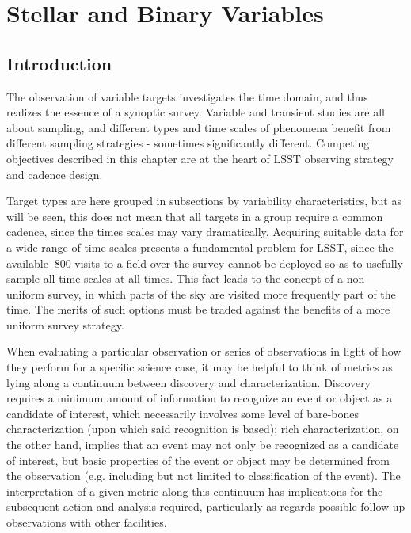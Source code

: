 
\chapter[Stellar and Binary Variables]{Stellar and Binary Variables}
\def\chpname{variables}\label{chp:\chpname}




\section{Introduction}

The observation of variable targets investigates the time domain, and thus realizes the essence of a synoptic survey.  Variable and transient studies are all about sampling, and different types and time scales of phenomena benefit from different sampling strategies - sometimes significantly different.  Competing objectives described in this chapter are at the heart of LSST observing strategy and cadence design.

Target types are here grouped in subsections by variability characteristics, but as will be seen, this does not mean that all targets in a group require a common cadence, since the times scales may vary dramatically.  Acquiring suitable data for a wide range of time scales presents a fundamental problem for LSST, since the available $~$800 visits to a field over the survey cannot be deployed so as to usefully sample all time scales at all times.  This fact leads to the concept of a non-uniform survey, in which parts of the sky are visited more frequently part of the time.  The merits of such options must be traded against the benefits of a more uniform survey strategy.

When evaluating a particular observation or series of observations in light of how they perform for a specific science case, it may be helpful to think of metrics as lying along a continuum between discovery and characterization. Discovery requires a minimum amount of information to recognize an event or object as a candidate of interest, which necessarily involves some level of bare-bones characterization (upon which said recognition is based); rich characterization, on the other hand, implies that an event may not only be recognized as a candidate of interest, but basic properties of the event or object may be determined from the observation (e.g. including but not limited to classification of the event). The interpretation of a given metric along this continuum has implications for the subsequent action and analysis required, particularly as regards possible follow-up observations with other facilities. 









